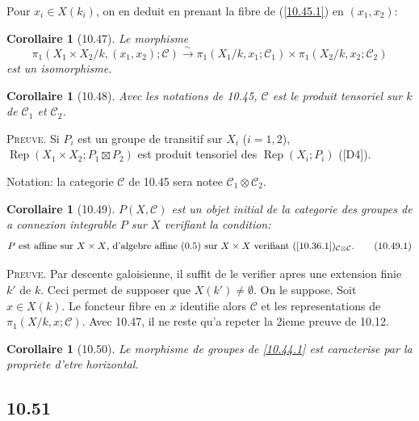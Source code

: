 \documentclass[12pt,a4paper]{article}
\theoremstyle{plain}
\newtheorem{corollary}[theorem]{Corollaire}
\theoremstyle{definition}
\theoremstyle{remark}
\DeclareMathOperator{\Rep}{Rep}
\begin{document}
Pour $x_i \in X(k_i)$, on en deduit en prenant la fibre de (\ref{10.45.1}) en $(x_1, x_2)$:

\begin{corollary}[10.47]
Le morphisme
$$\pi_1(X_1 \times X_2/k, (x_1, x_2); \mathcal{C}) \xrightarrow{\sim} \pi_1(X_1/k, x_1; \mathcal{C}_1) \times \pi_1(X_2/k, x_2; \mathcal{C}_2)$$
est un isomorphisme.
\end{corollary}

\begin{corollary}[10.48]
Avec les notations de 10.45, $\mathcal{C}$ est le produit tensoriel sur $k$ de $\mathcal{C}_1$ et $\mathcal{C}_2$.
\end{corollary}

\textsc{Preuve.} Si $P_i$ est un groupe de transitif sur $X_i$ ($i = 1, 2$), $\Rep(X_1 \times X_2; P_1 \boxtimes P_2)$ est produit tensoriel des $\Rep(X_i; P_i)$ ([D4]).

Notation: la categorie $\mathcal{C}$ de 10.45 sera notee $\mathcal{C}_1 \otimes \mathcal{C}_2$.

\begin{corollary}[10.49]
$P(X, \mathcal{C})$ est un objet initial de la categorie des groupes de a connexion integrable $P$ sur $X$ verifiant la condition:
\begin{equation}\label{10.49.1}
\text{$P$ est affine sur $X \times X$, d'algebre affine (0.5) sur $X \times X$ verifiant (\ref{10.36.1})$_{\mathcal{C} \otimes \mathcal{C}}$.} \tag{10.49.1}
\end{equation}
\end{corollary}

\textsc{Preuve.} Par descente galoisienne, il suffit de le verifier apres une extension finie $k'$ de $k$. Ceci permet de supposer que $X(k') \neq \emptyset$. On le suppose. Soit $x \in X(k)$. Le foncteur fibre en $x$ identifie alors $\mathcal{C}$ et les representations de $\pi_1(X/k, x; \mathcal{C})$. Avec 10.47, il ne reste qu'a repeter la 2ieme preuve de 10.12.

\begin{corollary}[10.50]
Le morphisme de groupes de \ref{10.44.1} est caracterise par la propriete d'etre horizontal.
\end{corollary}

\subsection*{10.51}
\end{document}
